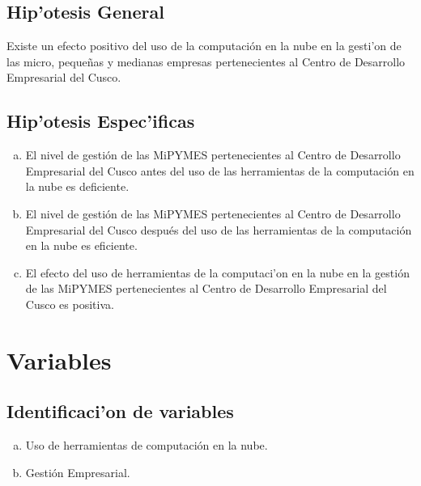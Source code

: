 \subsection{Hip'otesis General}

Existe un efecto positivo del uso de la computaci\'on en la nube en la
gesti'on de las micro, peque\~nas y medianas empresas pertenecientes al Centro de
Desarrollo Empresarial del Cusco.

\subsection{Hip'otesis Espec'ificas}
\begin{enumerate}[a.]
    \item El nivel de gesti\'on de las MiPYMES pertenecientes al Centro de Desarrollo
          Empresarial del Cusco antes del uso de las herramientas de la computaci\'on
          en la nube es deficiente.
    \item El nivel de gesti\'on de las MiPYMES pertenecientes al Centro de Desarrollo
          Empresarial del Cusco despu\'es del uso de las herramientas de la computaci\'on
          en la nube es eficiente.
    \item El efecto del uso de herramientas de la computaci'on en la nube en la
          gesti\'on de las MiPYMES pertenecientes al Centro de Desarrollo Empresarial
          del Cusco es positiva.
\end{enumerate}

\section{Variables}

\subsection{Identificaci'on de variables}

\begin{enumerate}[a.]
    \item Uso de herramientas de computaci\'on en la nube.
    \item Gesti\'on Empresarial.
\end{enumerate}

